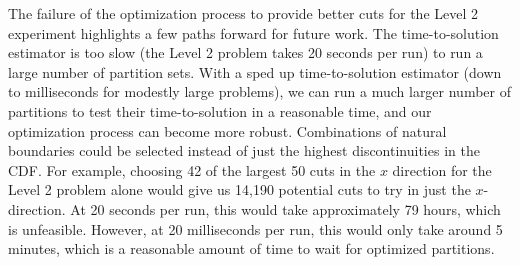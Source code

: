The failure of the optimization process to provide better cuts for the Level 2 experiment highlights a few paths forward for future work.
The time-to-solution estimator is too slow (the Level 2 problem takes 20 seconds per run) to run a large number of partition sets.
With a sped up time-to-solution estimator (down to milliseconds for modestly large problems), we can run a much larger number of partitions to test their time-to-solution in a reasonable time, and our optimization process can become more robust.
Combinations of natural boundaries could be selected instead of just the highest discontinuities in the CDF.
For example, choosing 42 of the largest 50 cuts in the $x$ direction for the Level 2 problem alone would give us 14,190 potential cuts to try in just the $x$-direction.
At 20 seconds per run, this would take approximately 79 hours, which is unfeasible.
However, at 20 milliseconds per run, this would only take around 5 minutes, which is a reasonable amount of time to wait for optimized partitions.

